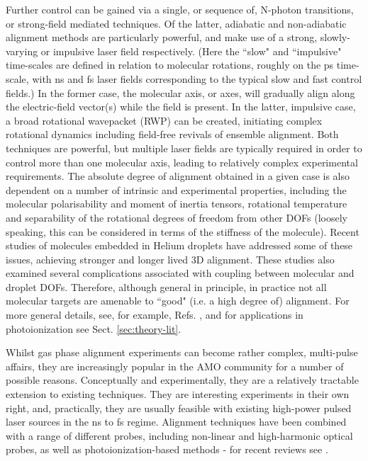 \documentclass[10pt]{article}
\begin{document}
Further control can be gained via a single, or sequence of, N-photon transitions, or strong-field mediated techniques. Of the latter, adiabatic and non-adiabatic alignment methods are particularly powerful, and make use of a strong, slowly-varying or impulsive laser field respectively. (Here the ``slow" and ``impulsive" time-scales are defined in relation to molecular rotations, roughly on the ps time-scale, with ns and fs laser fields corresponding to the typical slow and fast control fields.) In the former case, the molecular axis, or axes, will gradually align along the electric-field vector(s) while the field is present. In the latter, impulsive case, a broad rotational wavepacket (RWP) can be created, initiating complex rotational dynamics including field-free revivals of ensemble alignment. Both techniques are powerful, but multiple laser fields are typically required in order to control more than one molecular axis, leading to relatively complex experimental requirements. The absolute degree of alignment obtained in a given case is also dependent on a number of intrinsic and experimental properties, including the molecular polarisability 
and moment of inertia tensors, rotational temperature and separability of the rotational degrees of freedom from other DOFs (loosely speaking, this can be considered in terms of the stiffness of the molecule). Recent studies of molecules embedded in Helium droplets have addressed some of these issues, achieving stronger and longer lived 3D alignment. These studies also examined several complications associated with coupling between molecular and droplet DOFs.   Therefore, although general in principle, in practice not all molecular targets are amenable to ``good" (i.e. a high degree of) alignment. For more general details, see, for example, Refs. \cite{koch2019QuantumControlMolecular,Stapelfeldt2003,nielsen2022Helium}, and for applications in photoionization see Sect. \ref{sec:theory-lit}.

Whilst gas phase alignment experiments can become rather complex, multi-pulse affairs, they are increasingly popular in the AMO community for a number of possible reasons. Conceptually and experimentally, they are a relatively tractable extension to existing techniques. They are interesting experiments in their own right, and, practically, they are usually feasible with existing high-power pulsed laser sources in the ns to fs regime. Alignment techniques have been combined with a range of different probes, including non-linear and high-harmonic optical probes, as well as photoionization-based methods - for recent reviews see \cite{hasegawa2015NonadiabaticMolecularAlignment,koch2019QuantumControlMolecular}. 
\end{document}
